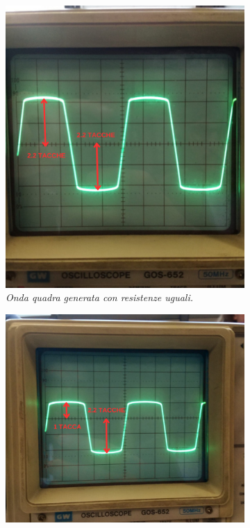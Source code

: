   \begin{figure}[h]
    \centering
      \begin{subfigure}{0.3\textwidth}
        \centering
        \includegraphics[width=\textwidth]{../assets/Resistenze_Uguali.png}
        \caption{\emph{Onda quadra generata con resistenze uguali.}}
        \label{fig : resistenze uguali}
      \end{subfigure}
      \hfill
      \begin{subfigure}{0.3\textwidth}
        \centering
        \includegraphics[width=\textwidth]{../assets/Resistenze_Diverse.png}

\end{subfigure}
\end{figure}
